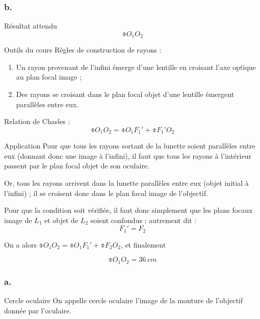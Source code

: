\documentclass[10pt,a5paper,notitlepage]{book}
\begin{document}
\setcounter{subsubsection}{1}
\subsubsection{b.}
\begin{rtcb}{Résultat attendu}
    $$\obar{O_1O_2}$$
\end{rtcb}

\begin{btcb}{Outils du cours}
    Règles de construction de rayons :
    \begin{enumerate}

        \item Un rayon provenant de l'infini émerge d'une lentille en croisant
            l'axe optique au plan focal image ;

        \item Des rayons se croisant dans le plan focal objet d'une lentille
            émergent parallèles entre eux.
    \end{enumerate}
    Relation de Chasles :
    \[ \obar{O_1O_2} = \obar{O_1F_1'} + \obar{F_1'O_2} \]
\end{btcb}

\begin{lgtcb}{Application}
    Pour que tous les rayons sortant de la lunette soient parallèles entre eux
    (donnant donc une image à l'infini), il faut que tous les rayons à
    l'intérieur passent par le plan focal objet de son oculaire.\bigbreak

    Or, tous les rayons arrivent dans la lunette parallèles entre eux (objet
    initial à l'infini) ; il se croisent donc dans le plan focal image de
    l'objectif. \bigbreak

    Pour que la condition soit vérifiée, il faut donc simplement que les plans
    focaux image de $L_1$ et objet de $L_2$ soient confondus ; autrement dit :
    \[ \boxed{F_1' = F_2} \]
    
    On a alors $\obar{O_1O_2} = \obar{O_1F_1'} + \obar{F_2O_2}$, et finalement

    \[ \boxed{\obar{O_1O_2} = \SI{+36}{cm}} \]
\end{lgtcb}

\subsubsection{a.}
\begin{defi}{Cercle oculaire}
    On appelle cercle oculaire l'image de la monture de l'objectif donnée par
    l'oculaire.
\end{defi}
\end{document}
